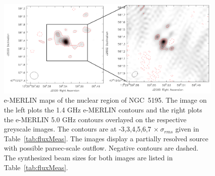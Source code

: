 \documentclass[fleqn,usenatbib]{mnras}
\def\tab{Table}
\begin{document}
\begin{figure}
\centering
\includegraphics[scale=0.5,clip=true,trim=0cm 0.1cm 0cm 0cm]{eMERLIN_combine_image.png}
\caption{e-MERLIN maps of the nuclear region of NGC~5195. The image on the left plots the 1.4 GHz e-MERLIN contours and the right plots the e-MERLIN 5.0 GHz contours overlayed on the respective greyscale images. The contours are at -3,3,4,5,6,7 $\times~\sigma_{rms}$ given in \tab~\ref{tab:fluxMeas}. The images display a partially resolved source with possible parsec-scale  outflow. Negative contours are dashed. The synthesized beam sizes for both images are listed in \tab~\ref{tab:fluxMeas}.} 
\label{fig:MERLINimg}
\end{figure}
\end{document}
